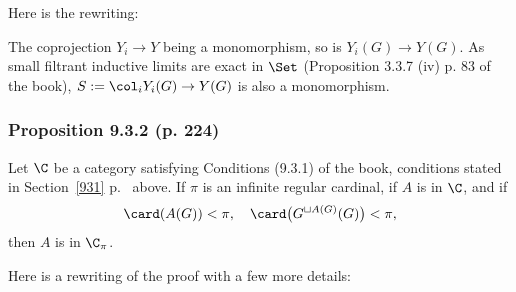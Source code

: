 \documentclass[12pt]{article}
\theoremstyle{remark}
\theoremstyle{definition}
\begin{document}
Here is the rewriting: 

The coprojection $Y_i\to Y$ being a monomorphism, so is $Y_i(G)\to Y(G)$. As small filtrant inductive limits are exact in $\Set$ (Proposition 3.3.7 (iv) p. 83 of the book), $S:=\col_iY_i(G)\to Y(G)$ is also a monomorphism.

%

\subsubsection{Proposition 9.3.2 (p. 224)}

\begin{prop}[Proposition 9.3.2 p.~224] 
Let $\C$ be a category satisfying Conditions (9.3.1) of the book, conditions stated in Section~\ref{931} p.~ above. If $\pi$ is an infinite regular cardinal, if $A$ is in $\C$, and if 
$$
\card(A(G))<\pi,\quad\card\big(G^{\sqcup A(G)}(G)\big)<\pi,
$$ 
then $A$ is in $\C_\pi$.
\end{prop}

Here is a rewriting of the proof with a few more details:
\end{document}
